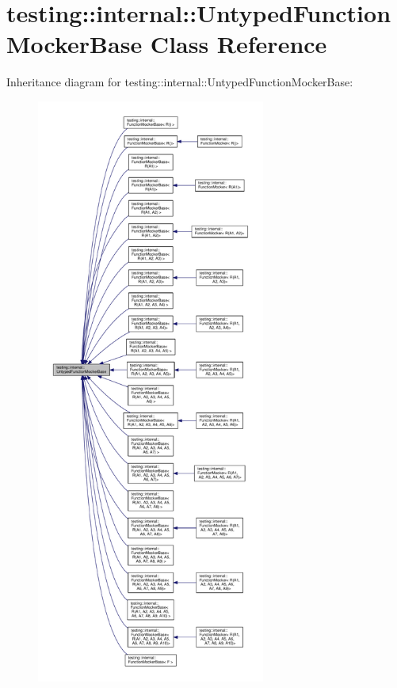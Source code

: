 \hypertarget{classtesting_1_1internal_1_1UntypedFunctionMockerBase}{}\section{testing\+:\+:internal\+:\+:Untyped\+Function\+Mocker\+Base Class Reference}
\label{classtesting_1_1internal_1_1UntypedFunctionMockerBase}


Inheritance diagram for testing\+:\+:internal\+:\+:Untyped\+Function\+Mocker\+Base\+:\nopagebreak
\begin{figure}[H]
\begin{center}
\leavevmode
\includegraphics[height=550pt]{classtesting_1_1internal_1_1UntypedFunctionMockerBase__inherit__graph}
\end{center}
\end{figure}
